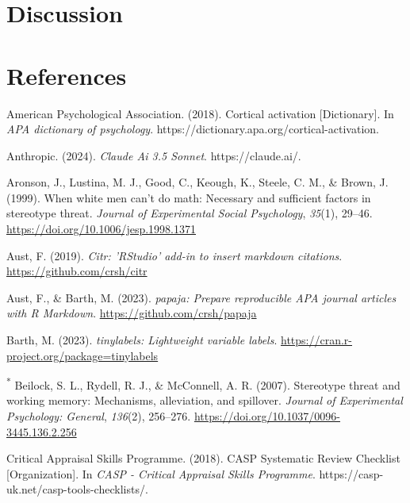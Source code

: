 \documentclass[
  stu]{apa7}
\newlength{\cslhangindent}
\newenvironment{CSLReferences}[2] %
 {\begin{list}{}{%
  \setlength{\itemindent}{0pt}
  \setlength{\leftmargin}{0pt}
  \setlength{\parsep}{0pt}
  \ifodd #1
   \setlength{\leftmargin}{\cslhangindent}
   \setlength{\itemindent}{-1\cslhangindent}
  \fi
  \setlength{\itemsep}{#2\baselineskip}}}
 {\end{list}}
\begin{document}
\section{Discussion}\label{discussion}

\newpage

\section{References}\label{references}

\label{refs}
\begin{CSLReferences}{1}{0}
American Psychological Association. (2018). Cortical activation {[}Dictionary{]}. In \emph{APA dictionary of psychology}. https://dictionary.apa.org/cortical-activation.

Anthropic. (2024). \emph{Claude {Ai} 3.5 {Sonnet}}. https://claude.ai/.

Aronson, J., Lustina, M. J., Good, C., Keough, K., Steele, C. M., \& Brown, J. (1999). When white men can't do math: {Necessary} and sufficient factors in stereotype threat. \emph{Journal of Experimental Social Psychology}, \emph{35}(1), 29--46. \url{https://doi.org/10.1006/jesp.1998.1371}

Aust, F. (2019). \emph{Citr: 'RStudio' add-in to insert markdown citations}. \url{https://github.com/crsh/citr}

Aust, F., \& Barth, M. (2023). \emph{{papaja}: {Prepare} reproducible {APA} journal articles with {R Markdown}}. \url{https://github.com/crsh/papaja}

Barth, M. (2023). \emph{{tinylabels}: Lightweight variable labels}. \url{https://cran.r-project.org/package=tinylabels}

\textsuperscript{*} Beilock, S. L., Rydell, R. J., \& McConnell, A. R. (2007). Stereotype threat and working memory: {Mechanisms}, alleviation, and spillover. \emph{Journal of Experimental Psychology: General}, \emph{136}(2), 256--276. \url{https://doi.org/10.1037/0096-3445.136.2.256}

Critical Appraisal Skills Programme. (2018). {CASP Systematic Review Checklist} {[}Organization{]}. In \emph{CASP - Critical Appraisal Skills Programme}. https://casp-uk.net/casp-tools-checklists/.


\end{CSLReferences}
\end{document}
